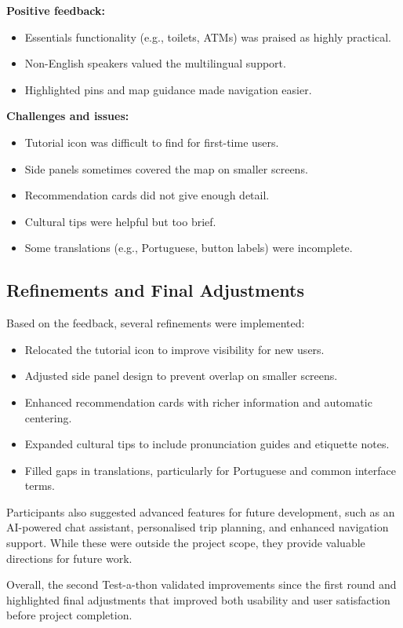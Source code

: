 \textbf{Positive feedback:}
\begin{itemize}
    \item Essentials functionality (e.g., toilets, ATMs) was praised as highly practical.
    \item Non-English speakers valued the multilingual support.
    \item Highlighted pins and map guidance made navigation easier.
\end{itemize}

\textbf{Challenges and issues:}
\begin{itemize}
    \item Tutorial icon was difficult to find for first-time users.
    \item Side panels sometimes covered the map on smaller screens.
    \item Recommendation cards did not give enough detail.
    \item Cultural tips were helpful but too brief.
    \item Some translations (e.g., Portuguese, button labels) were incomplete.
\end{itemize}

\subsection{Refinements and Final Adjustments}
Based on the feedback, several refinements were implemented:
\begin{itemize}
    \item Relocated the tutorial icon to improve visibility for new users.
    \item Adjusted side panel design to prevent overlap on smaller screens.
    \item Enhanced recommendation cards with richer information and automatic centering.
    \item Expanded cultural tips to include pronunciation guides and etiquette notes.
    \item Filled gaps in translations, particularly for Portuguese and common interface terms.
\end{itemize}

Participants also suggested advanced features for future development, such as an AI-powered chat assistant, personalised trip planning, and enhanced navigation support. While these were outside the project scope, they provide valuable directions for future work.

Overall, the second Test-a-thon validated improvements since the first round and highlighted final adjustments that improved both usability and user satisfaction before project completion.

